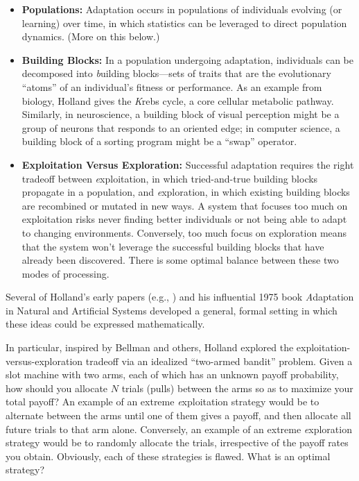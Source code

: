 \documentclass{sig-alternate}
\begin{document}
\begin{itemize}
\item {\bf Populations:} Adaptation occurs in populations of
  individuals evolving (or learning) over time, in which statistics 
  can be leveraged to direct population dynamics.  (More on this below.)  

\item {\bf Building Blocks:} In a population undergoing adaptation,
  individuals can be decomposed into {\emph building blocks}---sets of
  traits that are the evolutionary ``atoms'' of an individual's
  fitness or performance. As an example from biology, Holland gives
  the {\emph Krebs cycle}, a core cellular metabolic
  pathway. Similarly, in neuroscience, a building block of visual
  perception might be a group of neurons that responds to an oriented
  edge; in computer science, a building block of a sorting program
  might be a ``swap'' operator.

\item {\bf Exploitation Versus Exploration:} Successful adaptation
  requires the right tradeoff between {\emph exploitation}, in which
  tried-and-true building blocks propagate in a population, and {\emph
    exploration}, in which existing building blocks are recombined or
  mutated in new ways.  A system that focuses too much on exploitation
  risks never finding better individuals or not being able to adapt to
  changing environments.  Conversely, too much focus on exploration
  means that the system won't leverage the successful building blocks
  that have already been discovered.  There is some optimal balance
  between these two modes of processing.

\end{itemize}

Several of Holland's early papers (e.g.,
\cite{OutlineLogicalTheory,OptimalAllocation}) and his influential
1975 book {\emph Adaptation in Natural and Artificial Systems}
\cite{ANAS} developed a general, formal setting in which these ideas
could be expressed mathematically.

In particular, inspired by Bellman \cite{AdaptiveControlProcesses} and
others, Holland explored the exploitation-versus-exploration tradeoff
via an idealized ``two-armed bandit'' problem.  Given a slot machine
with two arms, each of which has an unknown payoff probability, how
should you allocate $N$ trials (pulls) between the arms so as to
maximize your total payoff?  An example of an extreme {\emph
  exploitation} strategy would be to alternate between the arms until
one of them gives a payoff, and then allocate all future trials to
that arm alone.  Conversely, an example of an extreme {\emph
  exploration} strategy would be to randomly allocate the trials,
irrespective of the payoff rates you obtain.  Obviously, each of these
strategies is flawed.  What is an optimal strategy?
\end{document}
